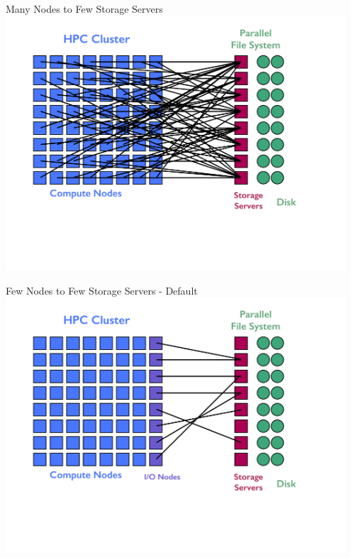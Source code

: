 \begin{frame}
  \begin{block}{Many Nodes to Few Storage Servers}
    \includegraphics[width=0.95\textwidth]{../common/pics/hardware/ParallelHardware18.pdf}
  \end{block}
\end{frame}

\begin{frame}
  \begin{block}{Few Nodes to Few Storage Servers - Default}
    \includegraphics[width=0.95\textwidth]{../common/pics/hardware/ParallelHardware19.pdf}
  \end{block}
\end{frame}


